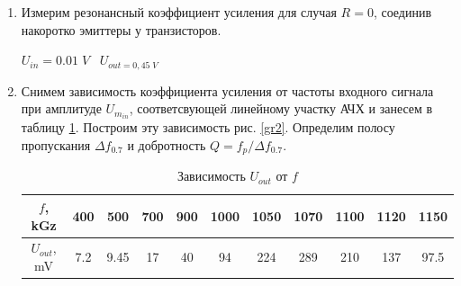 \documentclass[a4paper]{article}
\begin{document}
\begin{enumerate}
    \item Измерим резонансный коэффициент усиления для случая $R=0$, соединив накоротко эмиттеры у транзисторов. \par 
    $U_{in} = 0.01 \;V \;\;\; U_{out = 0,45\; V}$
    \begin{center}
    \end{center}


    \item Снимем зависимость коэффициента усиления от частоты входного сигнала при амплитуде $U_{m_{in}}$, соответсвующей линейному участку АЧХ и занесем в таблицу \ref{t2}. Построим эту зависимость рис. \ref{gr2}.
    Определим полосу пропускания $\Delta f_{0.7}$ и добротность $Q = f_{p}/\Delta f_{0.7}$. \par 

    \begin{center}
    \end{center}

    \begin{center}
    \end{center}

    \begin{table}[H]
        \centering
        \begin{center}
        \end{center}
        \vspace{0.1cm}
        \begin{tabular}{|c|c|c|c|c|c|c|c|c|c|c|}
            \hline
            $f$, kGz  &400& 500& 700& 900& 1000& 1050& 1070& 1100& 1120& 1150  \\ 
            \hline
            $U_{out}$, mV &7.2& 9.45& 17& 40& 94& 224& 289& 210& 137& 97.5  \\
            \hline
            \end{tabular}
            \caption{Зависимость $U_{out}$  от $f$}
            \label{t2}
    \end{table}


\end{enumerate}
\end{document}
